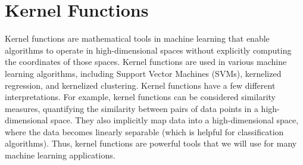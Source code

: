 \documentclass{article}[11pt]
\begin{document}
\section{Kernel Functions}
Kernel functions are mathematical tools in machine learning that enable algorithms to operate in high-dimensional spaces without explicitly computing the coordinates of those spaces.
Kernel functions are used in various machine learning algorithms, including Support Vector Machines (SVMs), kernelized regression, and kernelized clustering.
Kernel functions have a few different interpretations. 
For example, kernel functions can be considered similarity measures, quantifying the similarity between pairs of data points in a high-dimensional space.
They also implicitly map data into a high-dimensional space, where the data becomes linearly separable (which is helpful for classification algorithms).
Thus, kernel functions are powerful tools that we will use for many machine learning applications.
\end{document}

